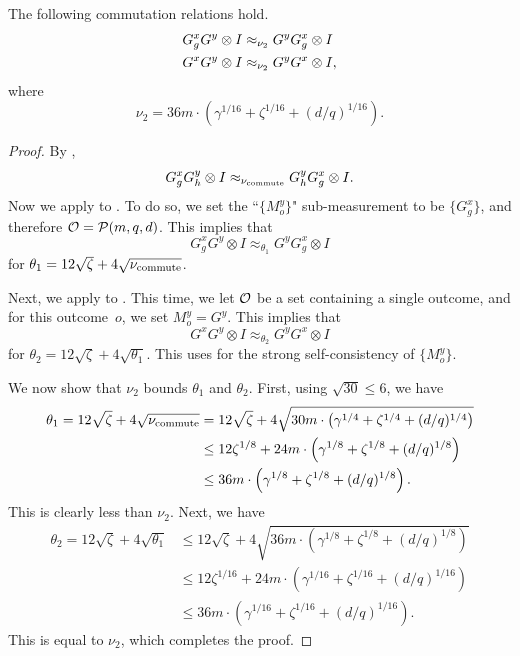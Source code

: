 \begin{corollary}\label{cor:commuting-with-G-complete}
The following commutation relations hold.
\begin{align*}
G^x_g  G^y \otimes I &\approx_{\nu_2}  G^y G^x_g \otimes I\\
G^x G^y \otimes I &\approx_{\nu_2}  G^y G^x \otimes I,
\end{align*}
where
\begin{equation*}
\nu_2 = 36 m \cdot \left(\gamma^{1/16} +  \zeta^{1/16} + (d/q)^{1/16}\right).
\end{equation*}
\end{corollary}
\begin{proof}
By ,
\begin{equation}\label{eq:com-main-copy}
G^x_g G^y_h \otimes I \approx_{\nu_{\mathrm{commute}}} G^y_h G^x_g \otimes I.
\end{equation}
Now we apply  to .
To do so, we set the ``$\{M^y_o\}$" sub-measurement to be $\{G^x_g\}$,
and therefore $\mathcal{O} = \mathcal{P}(m, q, d)$.
This implies that
\begin{equation}\label{eq:applied-the-lemma-to-com-main-copy}
G^x_g G^y \otimes I \approx_{\theta_1} G^y G^x_g \otimes I
\end{equation}
for $\theta_1 = 12 \sqrt{\zeta} + 4 \sqrt{\nu_{\mathrm{commute}}}$.

Next, we apply  to .
This time, we let $\mathcal{O}$ be a set containing a single outcome,
and for this outcome~$o$, we set $M^y_o = G^y$.
This implies that
\begin{equation*}
G^x G^y \otimes I \approx_{\theta_2} G^y G^x \otimes I
\end{equation*}
for $\theta_2 = 12 \sqrt{\zeta} + 4 \sqrt{\theta_1}$.
This uses  for the strong self-consistency of $\{M^y_o\}$.

We now show that $\nu_2$ bounds $\theta_1$ and $\theta_2$.
First, using $\sqrt{30} \leq 6$, we have
\begin{align*}
\theta_1 = 12 \sqrt{\zeta} + 4 \sqrt{\nu_{\mathrm{commute}}}
&= 12 \sqrt{\zeta} + 4 \sqrt{30 m \cdot \left(\gamma^{1/4} + \zeta^{1/4} + (d/q)^{1/4}\right)}\\
&\leq 12 \zeta^{1/8} + 24m \cdot \left(\gamma^{1/8} +\zeta^{1/8} +  (d/q)^{1/8}\right)\\
&\leq 36 m \cdot \left(\gamma^{1/8} + \zeta^{1/8} +  (d/q)^{1/8}\right).
\end{align*}
This is clearly less than $\nu_2$.
Next,  we have
\begin{align*}
\theta_2 = 12 \sqrt{\zeta} + 4 \sqrt{\theta_1}
&\leq 12 \sqrt{\zeta} + 4 \sqrt{36 m \cdot \left(\gamma^{1/8} + \zeta^{1/8} +  (d/q)^{1/8}\right)}\\
&\leq 12 \zeta^{1/16} + 24m \cdot \left(\gamma^{1/16} + \zeta^{1/16} + (d/q)^{1/16}\right)\\
&\leq 36 m \cdot \left( \gamma^{1/16} + \zeta^{1/16} + (d/q)^{1/16}\right).
\end{align*}
This is equal to $\nu_2$, which completes the proof.
\end{proof}

